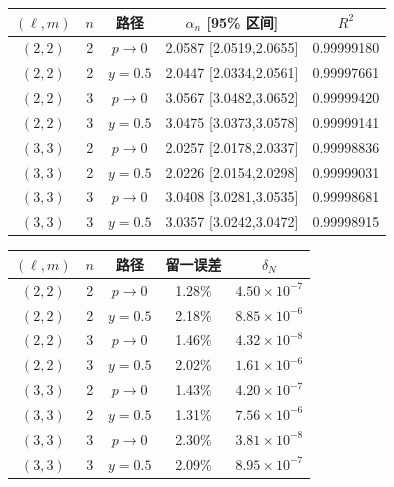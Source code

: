 \documentclass[UTF8,fontset=fandol,11pt,a4paper,oneside]{ctexart}
\numberwithin{equation}{section}
\begin{document}
\noindent\begin{minipage}{\linewidth}
\captionsetup{type=table}\caption{历史 principal 模七点幂律拟合审计，待复核。}\label{audit:tab:power-fit-quality}
\centering\fontsize{10}{13.5}\selectfont
\setlength{\tabcolsep}{6pt}\renewcommand{\arraystretch}{1.2}
\par{}\par\smallskip
\begin{tabular}{ccccc}\toprule
$(\ell,m)$ & $n$ & 路径 & $\alpha_n$ [95\% 区间] & $R^2$\\\midrule
$(2,2)$ & 2 & $p\to0$ & 2.0587 [2.0519,2.0655] & 0.99999180\\
$(2,2)$ & 2 & $y=0.5$ & 2.0447 [2.0334,2.0561] & 0.99997661\\
$(2,2)$ & 3 & $p\to0$ & 3.0567 [3.0482,3.0652] & 0.99999420\\
$(2,2)$ & 3 & $y=0.5$ & 3.0475 [3.0373,3.0578] & 0.99999141\\
$(3,3)$ & 2 & $p\to0$ & 2.0257 [2.0178,2.0337] & 0.99998836\\
$(3,3)$ & 2 & $y=0.5$ & 2.0226 [2.0154,2.0298] & 0.99999031\\
$(3,3)$ & 3 & $p\to0$ & 3.0408 [3.0281,3.0535] & 0.99998681\\
$(3,3)$ & 3 & $y=0.5$ & 3.0357 [3.0242,3.0472] & 0.99998915\\
\bottomrule\end{tabular}
\par\medskip
\par{}\par\smallskip
\begin{tabular}{ccccc}\toprule
$(\ell,m)$ & $n$ & 路径 & 留一误差 & $\delta_N$\\\midrule
$(2,2)$ & 2 & $p\to0$ & 1.28\% & $4.50\times10^{-7}$\\
$(2,2)$ & 2 & $y=0.5$ & 2.18\% & $8.85\times10^{-6}$\\
$(2,2)$ & 3 & $p\to0$ & 1.46\% & $4.32\times10^{-8}$\\
$(2,2)$ & 3 & $y=0.5$ & 2.02\% & $1.61\times10^{-6}$\\
$(3,3)$ & 2 & $p\to0$ & 1.43\% & $4.20\times10^{-7}$\\
$(3,3)$ & 2 & $y=0.5$ & 1.31\% & $7.56\times10^{-6}$\\
$(3,3)$ & 3 & $p\to0$ & 2.30\% & $3.81\times10^{-8}$\\
$(3,3)$ & 3 & $y=0.5$ & 2.09\% & $8.95\times10^{-7}$\\
\bottomrule\end{tabular}
\end{minipage}\par\addvspace{10pt}
\end{document}
